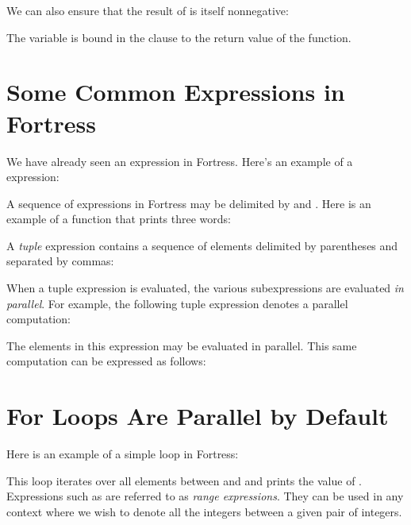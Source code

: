 We can also ensure that the result of  is itself nonnegative:


The variable  is bound in the  clause
to the return value of the function.

\section{Some Common Expressions in Fortress}
We have already seen an  expression in Fortress. Here's an
example of a  expression:



A sequence of expressions in Fortress may be delimited by  and
. Here is an example of a function that prints three words:



A \emph{tuple} expression contains a sequence of elements delimited by
parentheses and separated by commas:



When a tuple expression is evaluated, the various subexpressions are
evaluated \emph{in parallel}. For example, the following tuple
expression
denotes a parallel computation:



The elements in this expression may be evaluated in parallel.
This same computation can be expressed as follows:



\section{For Loops Are Parallel by Default}
Here is an example of a simple  loop in Fortress:

This  loop iterates
over all elements  between  and 
and prints the value of .
Expressions such as 
are referred to as \emph{range expressions}.
They can be used in any context where
we wish to denote all the integers between a given pair of integers.

